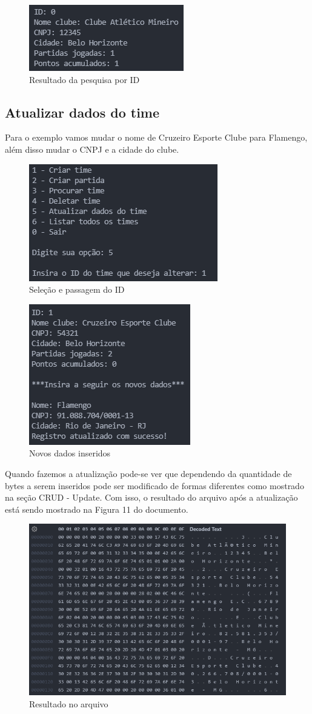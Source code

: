 \documentclass[12pt]{article}
\begin{document}
\newpage
\begin{figure}[ht]
\centering
\includegraphics[width=.4\textwidth]{result.png}
\caption{Resultado da pesquisa por ID}
\label{fig:readID_result}
\end{figure}

\subsection{Atualizar dados do time}
Para o exemplo vamos mudar o nome de Cruzeiro Esporte Clube para Flamengo, além disso mudar o CNPJ e a cidade do clube.

\begin{figure}[ht]
\centering
\includegraphics[width=.4\textwidth]{att_option.png}
\caption{Seleção e passagem do ID}
\label{fig:att_option}
\end{figure}

\begin{figure}[ht]
\centering
\includegraphics[width=.3\textwidth]{att_sucess.png}
\caption{Novos dados inseridos}
\label{fig:att_sucess}
\end{figure}

Quando fazemos a atualização pode-se ver que dependendo da quantidade de bytes a serem inseridos pode ser modificado de formas diferentes como mostrado na seção CRUD - Update. Com isso, o resultado do arquivo após a atualização está sendo mostrado na Figura 11 do documento.

\newpage
\begin{figure}[ht]
\centering
\includegraphics[width=.6\textwidth]{att_arquivo.png}
\caption{Resultado no arquivo}
\label{fig:att_arq}
\end{figure}
\end{document}
